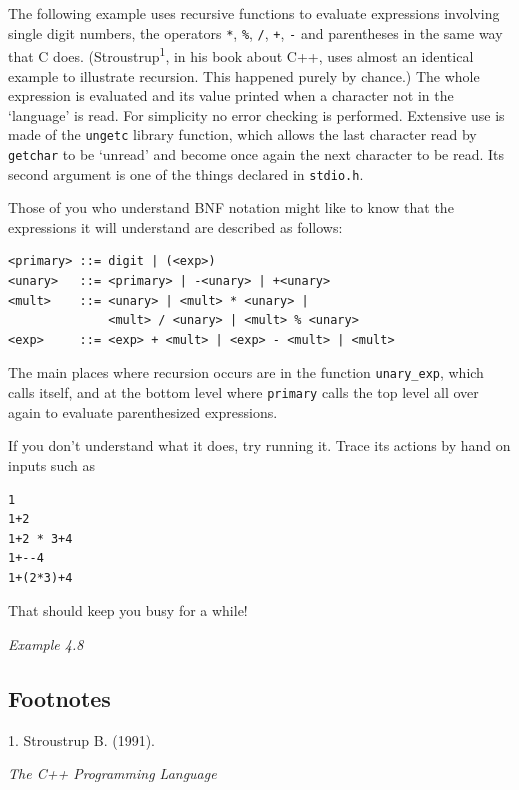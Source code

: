    The following example uses recursive functions to evaluate expressions
    involving single digit numbers, the operators \texttt{*},
    \texttt{\%}, \texttt{/}, \texttt{+}, \texttt{-} and
    parentheses in the same way that C does. (Stroustrup\textsuperscript{1}, in his book about C++, uses
    almost an identical example to illustrate recursion. This happened
    purely by chance.) The whole expression is evaluated and its value
    printed when a character not in the `language' is read. For
    simplicity no error checking is performed. Extensive use is made of the
    \texttt{ungetc} library function, which allows the last character
    read by \texttt{getchar} to be `unread' and become once again
    the next character to be read. Its second argument is one of the things
    declared in \texttt{stdio.h}.


   Those of you who understand BNF notation might like to know that the
    expressions it will understand are described as follows:

\begin{Verbatim}
<primary> ::= digit | (<exp>)
<unary>   ::= <primary> | -<unary> | +<unary>
<mult>    ::= <unary> | <mult> * <unary> |
              <mult> / <unary> | <mult> % <unary>
<exp>     ::= <exp> + <mult> | <exp> - <mult> | <mult>
\end{Verbatim}

   The main places where recursion occurs are in the function
    \texttt{unary\_exp}, which calls itself, and at the bottom level
    where \texttt{primary} calls the top level all over again to
    evaluate parenthesized expressions.


   If you don't understand what it does, try running it. Trace its
    actions by hand on inputs such as

\begin{Verbatim}
1
1+2
1+2 * 3+4
1+--4
1+(2*3)+4
\end{Verbatim}

   That should keep you busy for a while!


\begin{center}\textit{Example 4.8}\end{center}


  

\subsection{Footnotes}1. Stroustrup
     B. (1991). \begin{center}\textit{The C++ Programming Language}\end{center}


